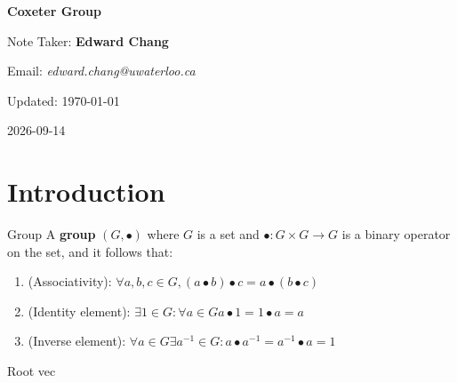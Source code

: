 \documentclass[11pt]{article}
\numberwithin{equation}{section}
\begin{document}
\begin{titlepage}
  \begin{center}
    \vspace*{4cm}
    \textbf{\Huge{Coxeter Group}}
 
    \vspace{1.5cm}
    Note Taker: \textbf{Edward Chang}

    Email: \textit{edward.chang@uwaterloo.ca}

    Updated: \today
  \end{center}
\end{titlepage}

\tableofcontents
\newpage
2026-09-14
\section{Introduction}
\begin{defm}{Group}
  A \textbf{group} \((G, \bullet)\) where \(G\) is a set and \(\bullet: G \times G \to G\) is a binary operator on the set, and it follows that:
  \begin{enumerate}[label=\roman*)]
    \item (Associativity): \(\forall a, b, c \in G, (a \bullet b) \bullet c = a \bullet (b \bullet c)\)
    \item (Identity element): \(\exists 1 \in G: \forall a \in G a \bullet 1 = 1 \bullet a = a\)
    \item (Inverse element): \(\forall a \in G \exists a ^{-1} \in G: a \bullet a ^{-1} = a ^{-1} \bullet a = 1\)
  \end{enumerate}
\end{defm}



\begin{noot}
  Root vec
\end{noot}
\end{document}
